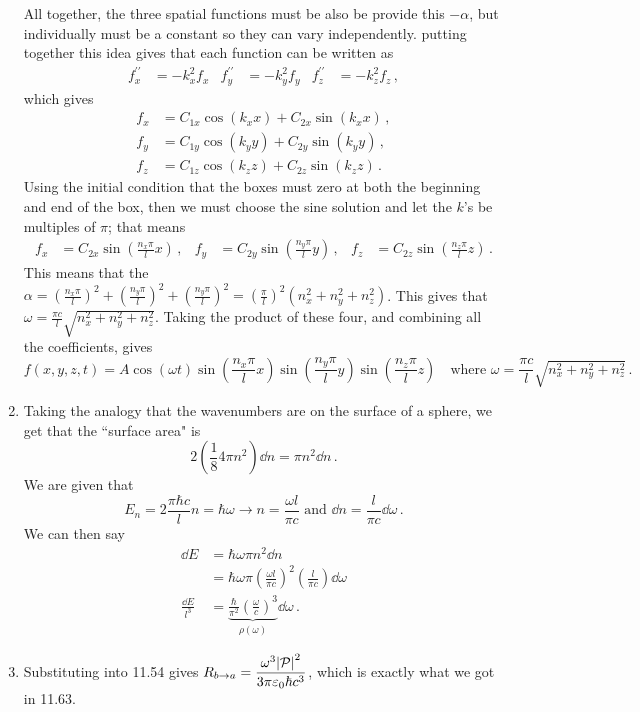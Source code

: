 \documentclass[11pt]{article}
\begin{document}
\begin{enumerate}[label=\alph*)]
All together, the three spatial functions must be also be provide this $-\alpha$, but individually must be a constant so they can vary independently. putting together this idea gives that each function can be written as
\begin{align*}
f_x^{\prime \prime} & = -k_x^2 f_x & f_y^{\prime \prime} & = -k_y^2 f_y & f_z^{\prime \prime} & = -k_z^2 f_z \, ,
\end{align*}
which gives
\begin{align*}
f_x & = C_{1x}\cos(k_x x) + C_{2x}\sin(k_x x) \, , \\
f_y & = C_{1y}\cos(k_y y) + C_{2y}\sin(k_y y) \, ,\\
f_z & = C_{1z}\cos(k_z z) + C_{2z}\sin(k_z z) \, . 
\end{align*}
Using the initial condition that the boxes must zero at both the beginning and end of the box, then we must choose the sine solution and let the $k$'s be multiples of $\pi$; that means
\begin{align*}
f_x & = C_{2x}\sin(\frac{n_x \pi}{l} x) \, ,& f_y & = C_{2y}\sin(\frac{n_y \pi}{l} y) \, , & f_z & = C_{2z}\sin(\frac{n_z \pi}{l} z) \, . 
\end{align*}
This means that the $\displaystyle{\alpha = \left(\frac{n_x \pi}{l}\right)^2 + \left(\frac{n_y \pi}{l}\right)^2 + \left(\frac{n_y \pi}{l}\right)^2 = \left(\frac{\pi}{l}\right)^2(n_x^2 + n_y^2 + n_z^2)}$. This gives that $\displaystyle{\omega = \frac{\pi c}{l}\sqrt{n_x^2 + n_y^2 + n_z^2}}$. Taking the product of these four, and combining all the coefficients, gives
\[\boxed{f(x,y,z,t) = A \cos(\omega t)\sin(\frac{n_x \pi}{l} x)\sin(\frac{n_y \pi}{l} y)\sin(\frac{n_z \pi}{l} z)} \quad \text{where } \omega = \frac{\pi c}{l}\sqrt{n_x^2 + n_y^2 + n_z^2} \, .\]

\item Taking the analogy that the wavenumbers are on the surface of a sphere, we get that the ``surface area" is
\[2\left(\frac{1}{8}4\pi n^2\right)\dd{n} = \pi n^2 \dd{n} \, .\]
We are given that 
\[E_n = 2\frac{\pi\hbar c}{l}n = \hbar \omega \rightarrow n = \frac{\omega l}{\pi c} \text{ and } \dd{n} = \frac{l}{\pi c}\dd{\omega} \, .\]
We can then say
\begin{align*}
\dd{E} & = \hbar \omega \pi n^2 \dd{n}\\
& = \hbar \omega \pi \left(\frac{\omega l}{\pi c}\right)^2 \left(\frac{l}{\pi c}\right) \dd{\omega}\\
\frac{\dd{E}}{l^3} & = \underbrace{\frac{\hbar}{\pi^2}\left(\frac{\omega}{c}\right)^3}_{\rho(\omega)} \dd{\omega} \, .
\end{align*}

\item Substituting into 11.54 gives $\displaystyle{R_{b\rightarrow a} = \frac{\omega^3\abs{\mathcal{P}}^2}{3\pi \varepsilon_0 \hbar c^3}}$, which is exactly what we got in 11.63.

\end{enumerate}
\end{document}
